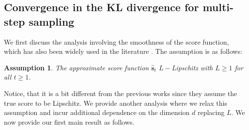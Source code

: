 \documentclass[11pt]{article}
\def\vs{{\bm{s}}}
\newtheorem{assumption}{Assumption}
\newtheorem{definition}{Definition}
\begin{document}




    

\subsection{Convergence in the KL divergence for multi-step sampling}
\label{subsec_3_analysis}


\noindent
We first discuss the analysis involving the smoothness of the score function, which has also been widely used in the literature \cite{lyu2024sampling, xu2024provably, chen2022sampling}. The assumption is as follows: 
\begin{assumption}
\label{smoothness_assumption}
    The approximate score function $\hat{\vs}_t$ $L-$Lipschitz with $L\geq 1$ for all $t \geq 1$.
\end{assumption}

\noindent
Notice, that it is a bit different from the previous works \cite{chen2022sampling, xu2024provably, lyu2024sampling, chen2023improved} since they assume the true score to be Lipschitz.
We provide another analysis where we relax this assumption and incur additional dependence on the dimension $d$ replacing $L$. We now provide our first main result as follows.
\end{document}
